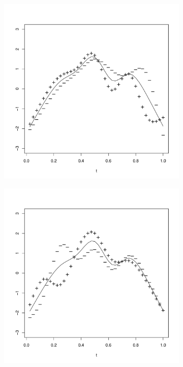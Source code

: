 \begin{figure}
	\begin{subfigure}
		[b]{0.32 
		\textwidth} \centering 
		\includegraphics[width=0.99 
		\textwidth]{Images-future-work/ef3pn.pdf} \caption{} \label{} 
	\end{subfigure}
	\begin{subfigure}
		[b]{0.32 
		\textwidth} \centering 
		\includegraphics[width=0.99 
		\textwidth]{Images-future-work/ef4pn.pdf} \caption{} \label{} 
	\end{subfigure}
	

\end{figure}
